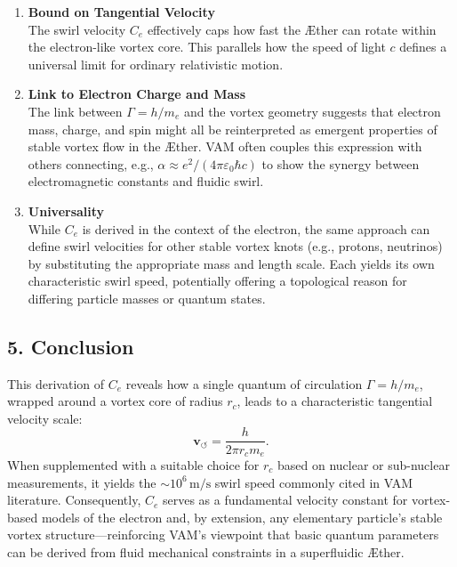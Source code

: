 \documentclass[a4paper,12pt]{article}
\begin{document}
\begin{enumerate}
    \item \textbf{Bound on Tangential Velocity} \\
    The swirl velocity \(C_e\) effectively caps how fast the Æther can rotate within the electron-like vortex core. This parallels how the speed of light \(c\) defines a universal limit for ordinary relativistic motion.
    \item \textbf{Link to Electron Charge and Mass} \\
    The link between \(\Gamma = h/m_e\) and the vortex geometry suggests that electron mass, charge, and spin might all be reinterpreted as emergent properties of stable vortex flow in the Æther. VAM often couples this expression with others connecting, e.g., \(\alpha\approx e^2/(4\pi\varepsilon_0\hbar c)\) to show the synergy between electromagnetic constants and fluidic swirl.
    \item \textbf{Universality} \\
    While \(C_e\) is derived in the context of the electron, the same approach can define swirl velocities for other stable vortex knots (e.g., protons, neutrinos) by substituting the appropriate mass and length scale. Each yields its own characteristic swirl speed, potentially offering a topological reason for differing particle masses or quantum states.
\end{enumerate}

\subsection*{5. Conclusion}

This derivation of \(C_e\) reveals how a single quantum of circulation \(\Gamma = h/m_e\), wrapped around a vortex core of radius \(r_c\), leads to a characteristic tangential velocity scale:
\[
    \mathbf{v}_{\scriptscriptstyle\boldsymbol{\circlearrowleft}} = \frac{h}{2\pi r_c m_e}.
\]
When supplemented with a suitable choice for \(r_c\) based on nuclear or sub-nuclear measurements, it yields the \(\sim10^6\,\text{m/s}\) swirl speed commonly cited in VAM literature. Consequently, \(C_e\) serves as a fundamental velocity constant for vortex-based models of the electron and, by extension, any elementary particle's stable vortex structure—reinforcing VAM's viewpoint that basic quantum parameters can be derived from fluid mechanical constraints in a superfluidic Æther.
\label{appendix:1}
\end{document}
